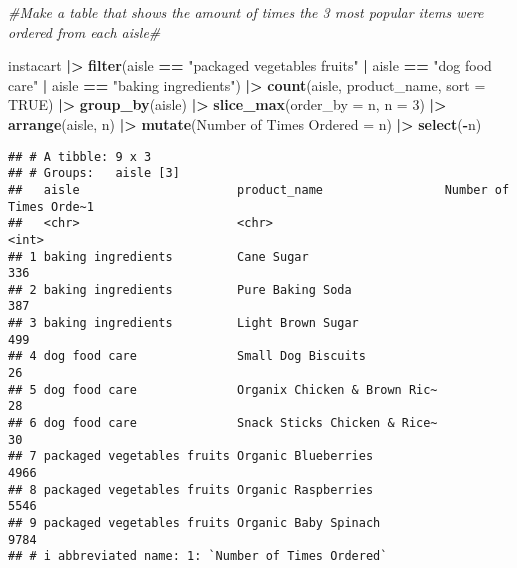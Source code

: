 \documentclass[
]{article}
\newenvironment{Shaded}{\begin{snugshade}}{\end{snugshade}}
\newcommand{\AttributeTok}[1]{\textcolor[rgb]{0.13,0.29,0.53}{#1}}
\newcommand{\CommentTok}[1]{\textcolor[rgb]{0.56,0.35,0.01}{\textit{#1}}}
\newcommand{\ConstantTok}[1]{\textcolor[rgb]{0.56,0.35,0.01}{#1}}
\newcommand{\DecValTok}[1]{\textcolor[rgb]{0.00,0.00,0.81}{#1}}
\newcommand{\FunctionTok}[1]{\textcolor[rgb]{0.13,0.29,0.53}{\textbf{#1}}}
\newcommand{\NormalTok}[1]{#1}
\newcommand{\OtherTok}[1]{\textcolor[rgb]{0.56,0.35,0.01}{#1}}
\newcommand{\SpecialCharTok}[1]{\textcolor[rgb]{0.81,0.36,0.00}{\textbf{#1}}}
\newcommand{\StringTok}[1]{\textcolor[rgb]{0.31,0.60,0.02}{#1}}
\begin{document}
\begin{Shaded}
\begin{Highlighting}[]
\CommentTok{\#Make a table that shows the amount of times the 3 most popular items were ordered from each aisle\#}

\NormalTok{instacart }\SpecialCharTok{|\textgreater{}} \FunctionTok{filter}\NormalTok{(aisle }\SpecialCharTok{==} \StringTok{"packaged vegetables fruits"} \SpecialCharTok{|}\NormalTok{ aisle }\SpecialCharTok{==} \StringTok{"dog food care"} \SpecialCharTok{|}
\NormalTok{                      aisle }\SpecialCharTok{==} \StringTok{"baking ingredients"}\NormalTok{) }\SpecialCharTok{|\textgreater{}} 
                      \FunctionTok{count}\NormalTok{(aisle, product\_name, }\AttributeTok{sort =} \ConstantTok{TRUE}\NormalTok{) }\SpecialCharTok{|\textgreater{}} \FunctionTok{group\_by}\NormalTok{(aisle) }\SpecialCharTok{|\textgreater{}}
                      \FunctionTok{slice\_max}\NormalTok{(}\AttributeTok{order\_by =}\NormalTok{ n, }\AttributeTok{n =} \DecValTok{3}\NormalTok{) }\SpecialCharTok{|\textgreater{}}
                      \FunctionTok{arrange}\NormalTok{(aisle, n) }\SpecialCharTok{|\textgreater{}}
                      \FunctionTok{mutate}\NormalTok{(}\StringTok{\textasciigrave{}}\AttributeTok{Number of Times Ordered}\StringTok{\textasciigrave{}} \OtherTok{=}\NormalTok{ n) }\SpecialCharTok{|\textgreater{}}
                      \FunctionTok{select}\NormalTok{(}\SpecialCharTok{{-}}\NormalTok{n)}
\end{Highlighting}
\end{Shaded}

\begin{verbatim}
## # A tibble: 9 x 3
## # Groups:   aisle [3]
##   aisle                      product_name                 Number of Times Orde~1
##   <chr>                      <chr>                                         <int>
## 1 baking ingredients         Cane Sugar                                      336
## 2 baking ingredients         Pure Baking Soda                                387
## 3 baking ingredients         Light Brown Sugar                               499
## 4 dog food care              Small Dog Biscuits                               26
## 5 dog food care              Organix Chicken & Brown Ric~                     28
## 6 dog food care              Snack Sticks Chicken & Rice~                     30
## 7 packaged vegetables fruits Organic Blueberries                            4966
## 8 packaged vegetables fruits Organic Raspberries                            5546
## 9 packaged vegetables fruits Organic Baby Spinach                           9784
## # i abbreviated name: 1: `Number of Times Ordered`
\end{verbatim}
\end{document}
